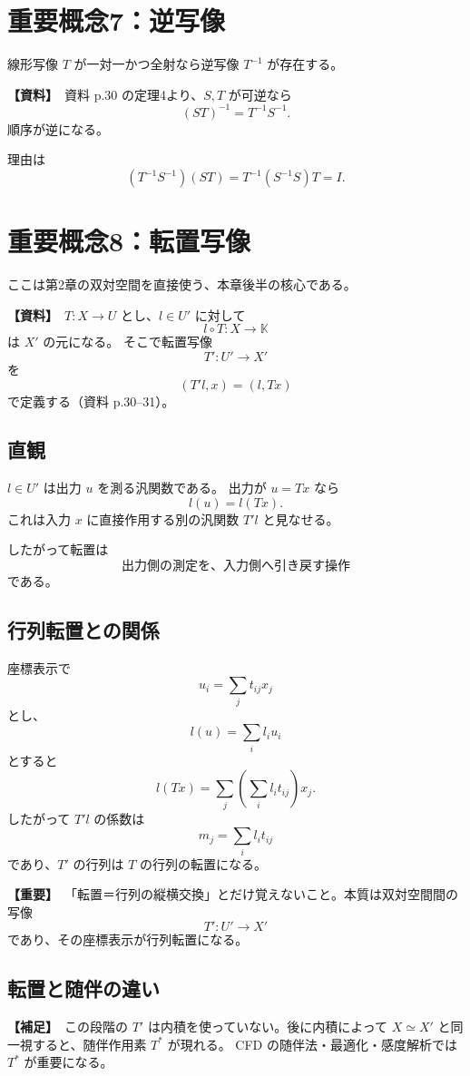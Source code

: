\documentclass[a4paper,11pt]{ltjsarticle}
\newcommand{\K}{\mathbb{K}}
\newcommand{\sourceitem}{\textbf{【資料】}}
\newcommand{\suppitem}{\textbf{【補足】}}
\newcommand{\highimportance}{\textbf{【重要】}}
\begin{document}
\section{重要概念7：逆写像}

線形写像 $T$ が一対一かつ全射なら逆写像 $T^{-1}$ が存在する。

\sourceitem\ 資料 p.30 の定理4より、$S,T$ が可逆なら
\[
\boxed{(ST)^{-1}=T^{-1}S^{-1}.}
\]
順序が逆になる。

理由は
\[
(T^{-1}S^{-1})(ST)
=T^{-1}(S^{-1}S)T
=I.
\]

\section{重要概念8：転置写像}

ここは第2章の双対空間を直接使う、本章後半の核心である。

\sourceitem\ $T:X\to U$ とし、$l\in U'$ に対して
\[
l\circ T:X\to\K
\]
は $X'$ の元になる。
そこで転置写像
\[
\boxed{T':U'\to X'}
\]
を
\[
\boxed{(T'l,x)=(l,Tx)}
\]
で定義する（資料 p.30--31）。

\subsection{直観}
$l\in U'$ は出力 $u$ を測る汎関数である。
出力が $u=Tx$ なら
\[
l(u)=l(Tx).
\]
これは入力 $x$ に直接作用する別の汎関数 $T'l$ と見なせる。

したがって転置は
\[
\boxed{\text{出力側の測定を、入力側へ引き戻す操作}}
\]
である。

\subsection{行列転置との関係}
座標表示で
\[
u_i=\sum_j t_{ij}x_j
\]
とし、
\[
l(u)=\sum_i l_i u_i
\]
とすると
\[
l(Tx)=\sum_j\left(\sum_i l_i t_{ij}\right)x_j.
\]
したがって $T'l$ の係数は
\[
m_j=\sum_i l_i t_{ij}
\]
であり、$T'$ の行列は $T$ の行列の転置になる。

\highimportance\ 「転置＝行列の縦横交換」とだけ覚えないこと。本質は双対空間間の写像
\[
T':U'\to X'
\]
であり、その座標表示が行列転置になる。

\subsection{転置と随伴の違い}
\suppitem\ この段階の $T'$ は内積を使っていない。後に内積によって $X\simeq X'$ と同一視すると、随伴作用素 $T^*$ が現れる。
CFD の随伴法・最適化・感度解析では $T^*$ が重要になる。
\end{document}
